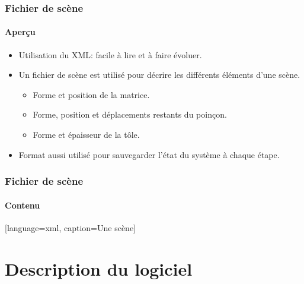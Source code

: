 \documentclass{beamer}
\begin{document}
\begin{frame}
    \frametitle{Fichier de scène}
    \framesubtitle{Aperçu}
    \begin{itemize}
        \item Utilisation du XML: facile à lire et à faire évoluer.
        \item Un fichier de scène est utilisé pour décrire les différents éléments d'une scène.
            \begin{itemize}
                \item Forme et position de la matrice.
                \item Forme, position et déplacements restants du poinçon.
                \item Forme et épaisseur de la tôle.
            \end{itemize}
        \item Format aussi utilisé pour sauvegarder l'état du système à chaque étape.
    \end{itemize}
\end{frame}
\begin{frame}
    \frametitle{Fichier de scène}
    \framesubtitle{Contenu}
        [language=xml, caption={Une scène}]
\end{frame}
\section{Description du logiciel}
\end{document}
